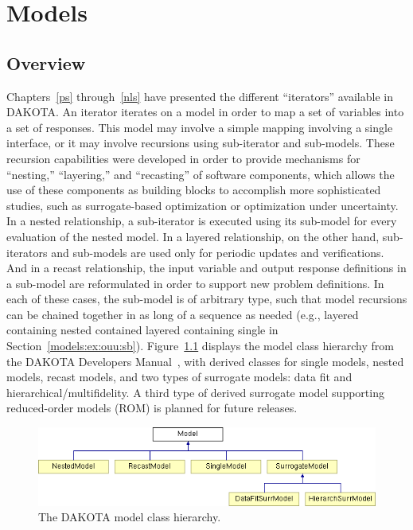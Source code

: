 \chapter{Models}\label{models}

\section{Overview}\label{models:overview}

Chapters~\ref{ps} through~\ref{nls} have presented the different
``iterators'' available in DAKOTA.  An iterator iterates on a model in
order to map a set of variables into a set of responses.  This model
may involve a simple mapping involving a single interface, or it may
involve recursions using sub-iterator and sub-models.  These recursion
capabilities were developed in order to provide mechanisms for
``nesting,'' ``layering,'' and ``recasting'' of software components,
which allows the use of these components as building blocks to
accomplish more sophisticated studies, such as surrogate-based
optimization or optimization under uncertainty.  In a nested
relationship, a sub-iterator is executed using its sub-model for every
evaluation of the nested model.  In a layered relationship, on the
other hand, sub-iterators and sub-models are used only for periodic
updates and verifications.  And in a recast relationship, the input
variable and output response definitions in a sub-model are
reformulated in order to support new problem definitions.  In each of
these cases, the sub-model is of arbitrary type, such that model
recursions can be chained together in as long of a sequence as needed
(e.g., layered containing nested contained layered containing single
in Section~\ref{models:ex:ouu:sb}).  Figure~\ref{model:hier} displays
the model class hierarchy from the DAKOTA Developers
Manual~\cite{DevMan}, with derived classes for single models, nested
models, recast models, and two types of surrogate models: data fit and
hierarchical/multifidelity.  A third type of derived surrogate model
supporting reduced-order models (ROM) is planned for future releases.

\begin{figure}
  \centering \includegraphics[scale=0.65]{images/classDakota_1_1Model}
  \caption{The DAKOTA model class hierarchy.}  \label{model:hier}
\end{figure}

